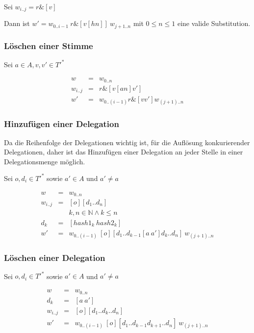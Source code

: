 \documentclass[]{article}
\begin{document}
Sei $w_{i..j} = r\& [v]$

Dann ist $w' = w_{0 .. i-1}\ r \& [v[h n]]\ w_{j+1 .. n}$ mit $0\leq n\leq 1$ eine valide Substitution.

\subsubsection*{Löschen einer Stimme}

Sei $a\in A, v,v'\in T'^*$

\begin{eqnarray}
  w &=& w_{0..n} \\
  w_{i..j}&=& r\& [v [an] v'] \\
  w' &=& w_{0..(i-1)} r\& [vv'] w_{(j+1)..n}
\end{eqnarray}


\subsubsection*{Hinzufügen einer Delegation}
Da die Reihenfolge der Delegationen wichtig ist, für die Auflösung konkurierender Delegationen, daher ist das Hinzufügen einer Delegation an jeder Stelle in einer Delegationsmenge möglich.

Sei $o,d_i \in T'^*$ sowie $a'\in A$ und $a'\neq a$

\begin{eqnarray}
  w &=& w_{0..n} \\
  w_{i..j} &=& [o][d_1 .. d_n] \\
  &&k,n\in \mathbb{N} \land k\leq n \\
  d_k &=& [hash1_k\ hash2_k] \\ 
  w' &=& w_{0 .. (i-1)}\ [o][d_1 .. d_{k-1} [a\ a'] d_k .. d_n ]\ w_{(j+1) .. n}
\end{eqnarray}

\subsubsection*{Löschen einer Delegation}

Sei $o,d_i \in T'^*$ sowie $a'\in A$ und $a'\neq a$

\begin{eqnarray}
  w &=& w_{0..n} \\
  d_k &=& [a\ a'] \\
  w_{i..j} &=& [o][d_1 .. d_{k} .. d_n ] \\
  w' &=& w_{0 .. (i-1)}\ [o][d_1 .. d_{k-1} d_{k+1} .. d_n ]\ w_{(j+1) .. n}
\end{eqnarray}
\end{document}
